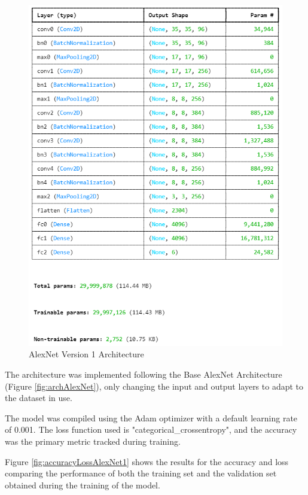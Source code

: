 \documentclass[conference]{IEEEtran}
\begin{document}
\begin{figure}[H]
    \centering
    \includegraphics[width=1\linewidth]{images/arch1AlexNet.png}
    \caption{AlexNet Version 1 Architecture}
    \label{fig:arch1AlexNet}
\end{figure}

The architecture was implemented following the Base AlexNet Architecture (Figure \ref{fig:archAlexNet}), only changing the input and output layers to adapt to the dataset in use.

The model was compiled using the Adam optimizer with a default learning rate of 0.001. The loss function used is "categorical\_crossentropy", and the accuracy was the primary metric tracked during training.

Figure \ref{fig:accuracyLossAlexNet1} shows the results for the accuracy and loss comparing the performance of both the training set and the validation set obtained during the training of the model.
\end{document}
